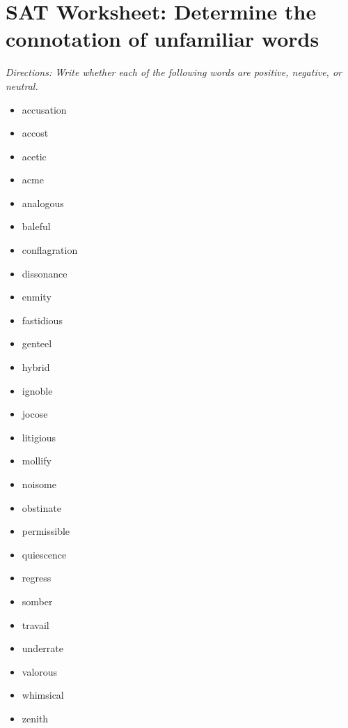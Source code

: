 \section{\sloppy SAT Worksheet: Determine the connotation of unfamiliar words}

\textit{Directions: Write whether each of the following words are positive, negative, or neutral.}

\begin{spacing}{1.5}
\begin{multicols}{2}
\renewcommand{\columnseprule}{0pt}
\begin{itemize}[label=]
\item accusation \longline
\item accost \longline
\item acetic \longline
\item acme \longline
\item analogous \longline
\item baleful \longline
\item conflagration \longline
\item dissonance \longline
\item enmity \longline
\item fastidious \longline
\item genteel \longline
\item hybrid \longline
\item ignoble \longline
\item jocose \longline
\item litigious \longline
\item mollify \longline
\item noisome \longline
\item obstinate \longline
\item permissible \longline
\item quiescence \longline
\item regress \longline
\item somber \longline
\item travail \longline
\item underrate \longline
\item valorous \longline
\item whimsical \longline
\item zenith \longline
\end{itemize}
\end{multicols}
\end{spacing}